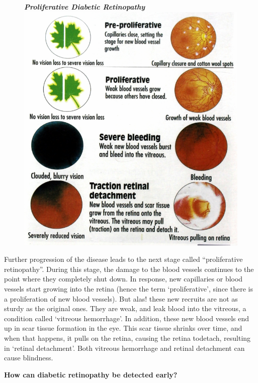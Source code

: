 \begin{figure}
\centering
\textbf{\textit{Proliferative Diabetic Retinopathy}}\\
\includegraphics[scale=1.4]{images/055.jpg}
\end{figure}

Further progression of the disease leads to the next stage called “proliferative retinopa\-thy”. During this stage, the damage to the blood vessels continues to the point where they completely shut down. In response, new capillaries or blood vessels start growing into the retina (hence the term ‘proliferative’, since there is a proliferation of new blood vessels). But alas! these new recruits are not as sturdy as the original ones. They are weak, and leak blood into the vitreous, a condition called ‘vitreous hemorrhage’. In addi\-tion, these new blood vessels end up in scar tissue formation in the eye. This scar tissue shrinks over time, and when that happens, it pulls on the retina, causing the retina to\break detach, resulting in ‘retinal deta\-chment’. Both vitreous hemorrhage and retinal detachment can cause blindness.

\vskip 4pt
\noindent\textbf{How can diabetic retinopathy be detected early?}
\vskip 4pt

